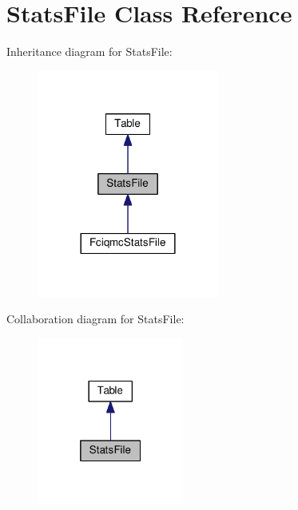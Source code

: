 \hypertarget{classStatsFile}{}\section{Stats\+File Class Reference}
\label{classStatsFile}


Inheritance diagram for Stats\+File\+:\nopagebreak
\begin{figure}[H]
\begin{center}
\leavevmode
\includegraphics[width=168pt]{classStatsFile__inherit__graph}
\end{center}
\end{figure}


Collaboration diagram for Stats\+File\+:\nopagebreak
\begin{figure}[H]
\begin{center}
\leavevmode
\includegraphics[width=136pt]{classStatsFile__coll__graph}
\end{center}
\end{figure}
